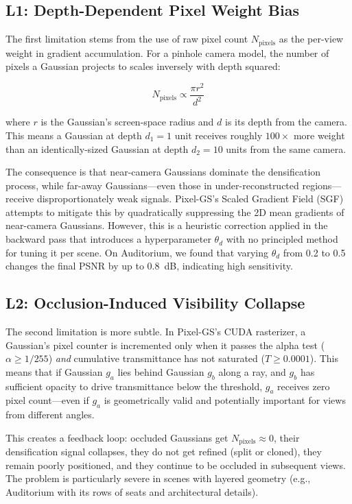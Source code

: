 \documentclass[conference]{IEEEtran}
\begin{document}
\subsection{L1: Depth-Dependent Pixel Weight Bias}

The first limitation stems from the use of raw pixel count $N_{\text{pixels}}$ as the per-view weight in gradient accumulation. For a pinhole camera model, the number of pixels a Gaussian projects to scales inversely with depth squared:

\begin{equation}
N_{\text{pixels}} \propto \frac{\pi r^2}{d^2}
\end{equation}

where $r$ is the Gaussian's screen-space radius and $d$ is its depth from the camera. This means a Gaussian at depth $d_1 = 1$ unit receives roughly $100\times$ more weight than an identically-sized Gaussian at depth $d_2 = 10$ units from the same camera.

The consequence is that near-camera Gaussians dominate the densification process, while far-away Gaussians—even those in under-reconstructed regions—receive disproportionately weak signals. Pixel-GS's Scaled Gradient Field (SGF) attempts to mitigate this by quadratically suppressing the 2D mean gradients of near-camera Gaussians. However, this is a heuristic correction applied in the backward pass that introduces a hyperparameter $\theta_d$ with no principled method for tuning it per scene. On Auditorium, we found that varying $\theta_d$ from 0.2 to 0.5 changes the final PSNR by up to 0.8~dB, indicating high sensitivity.

\subsection{L2: Occlusion-Induced Visibility Collapse}

The second limitation is more subtle. In Pixel-GS's CUDA rasterizer, a Gaussian's pixel counter is incremented only when it passes the alpha test ($\alpha \geq 1/255$) \emph{and} cumulative transmittance has not saturated ($T \geq 0.0001$). This means that if Gaussian $g_a$ lies behind Gaussian $g_b$ along a ray, and $g_b$ has sufficient opacity to drive transmittance below the threshold, $g_a$ receives zero pixel count—even if $g_a$ is geometrically valid and potentially important for views from different angles.

This creates a feedback loop: occluded Gaussians get $N_{\text{pixels}} \approx 0$, their densification signal collapses, they do not get refined (split or cloned), they remain poorly positioned, and they continue to be occluded in subsequent views. The problem is particularly severe in scenes with layered geometry (e.g., Auditorium with its rows of seats and architectural details).
\end{document}
